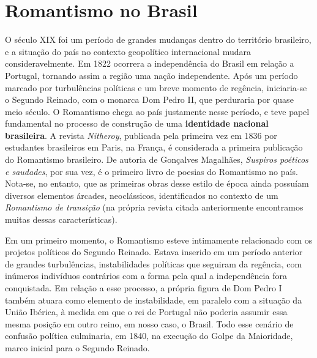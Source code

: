 \documentclass[12pt]{book}
\begin{document}
		\chapter{Romantismo no Brasil}
		\par O século XIX foi um período de grandes mudanças dentro do território brasileiro, e a situação do país no contexto geopolítico internacional mudara consideravelmente. Em 1822 ocorrera a independência do Brasil em relação a Portugal, tornando assim a região uma nação independente. Após um período marcado por turbulências políticas e um breve momento de regência, iniciaria-se o Segundo Reinado, com o monarca Dom Pedro II, que perduraria por quase meio século. O Romantismo chega ao país justamente nesse período, e teve papel fundamental no processo de construção de uma \textbf{identidade nacional brasileira}. A revista \textit{Nitheroy}, publicada pela primeira vez em 1836 por estudantes brasileiros em Paris, na França, é considerada a primeira publicação do Romantismo brasileiro. De autoria de Gonçalves Magalhães, \textit{Suspiros poéticos e saudades}, por sua vez, é o primeiro livro de poesias do Romantismo no país. Nota-se, no entanto, que as primeiras obras desse estilo de época ainda possuíam diversos elementos árcades, neoclássicos, identificados no contexto de um \textit{Romantismo de transição} (na própria revista citada anteriormente encontramos muitas dessas características).
		\par Em um primeiro momento, o Romantismo esteve intimamente relacionado com os projetos políticos do Segundo Reinado. Estava inserido em um período anterior de grandes turbulências, instabilidades políticas que seguiram da regência, com inúmeros indivíduos contrários com a forma pela qual a independência fora conquistada. Em relação a esse processo, a própria figura de Dom Pedro I também atuara como elemento de instabilidade, em paralelo com a situação da União Ibérica, à medida em que o rei de Portugal não poderia assumir essa mesma posição em outro reino, em nosso caso, o Brasil. Todo esse cenário de confusão política culminaria, em 1840, na execução do Golpe da Maioridade, marco inicial para o Segundo Reinado.
\end{document}
